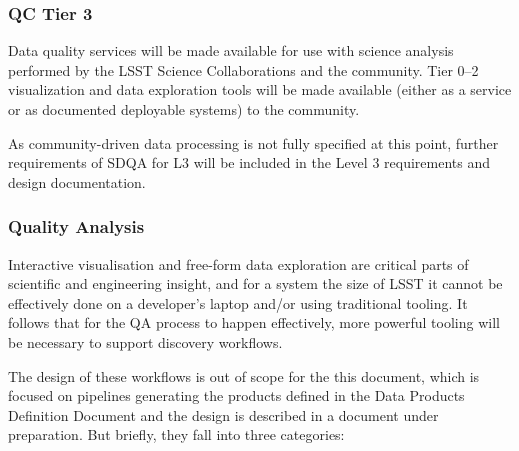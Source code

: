 \subsubsection{QC Tier 3}
\label{sec:qaQA3}

Data quality services will be made available for use with science analysis performed by the LSST Science Collaborations and the community. Tier 0--2 visualization and data exploration tools will be made available (either as a service or as documented deployable systems) to the community.

As community-driven data processing is not fully specified at this point, further requirements of SDQA for L3 will be included in the Level 3 requirements and design documentation.


\subsubsection{Quality Analysis}
\label{sec:qaInteractiveVis}

Interactive visualisation and free-form data exploration are critical parts of scientific and engineering insight, and for a system the size of LSST it cannot be effectively done on a developer's laptop and/or using traditional tooling. It follows that for the QA process to happen effectively, more powerful tooling will be necessary to support discovery workflows.

The design of these workflows is out of scope for the this document, which is focused on pipelines generating the products defined in the Data Products Definition Document and the design is described in a document under preparation. But briefly, they fall into three categories:

